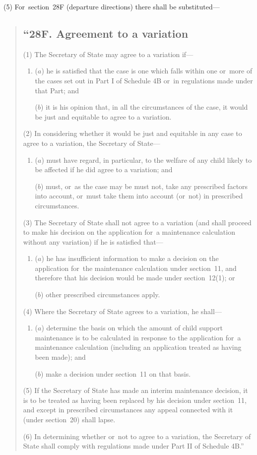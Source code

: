 \documentclass[12pt,a4paper]{article}
\begin{document}
(5) For~section~28F (departure directions) there shall be substituted—
\begin{quotation}
\subsection*{“28F. Agreement to a variation}

(1) The Secretary of State may agree to a variation if—
\begin{enumerate}\item[]
($a$) he is satisfied that the case is one which falls within one or~more of the cases set out in Part I of Schedule 4B or~in regulations made under that Part; and

($b$) it is his opinion that, in all the circumstances of the case, it would be just and equitable to agree to a variation.
\end{enumerate}

(2) In considering whether it would be just and equitable in any case to agree to a variation, the Secretary of State—
\begin{enumerate}\item[]
($a$) must have regard, in particular, to the welfare of any child likely to be affected if he did agree to a variation; and

($b$) must, or~as the case may be must not, take any prescribed factors into account, or~must take them into account (or~not) in prescribed circumstances.
\end{enumerate}

(3) The Secretary of State shall not agree to a variation (and shall proceed to make his decision on the application for~a maintenance calculation without any variation) if he is satisfied that—
\begin{enumerate}\item[]
($a$) he has insufficient information to make a decision on the application for~the maintenance calculation under section~11, and therefore that his decision would be made under section~12(1); or

($b$) other prescribed circumstances apply.
\end{enumerate}

(4) Where the Secretary of State agrees to a variation, he shall—
\begin{enumerate}\item[]
($a$) determine the basis on which the amount of child support maintenance is to be calculated in response to the application for~a maintenance calculation (including an application treated as having been made); and

($b$) make a decision under section~11 on that basis.
\end{enumerate}

(5) If the Secretary of State has made an interim maintenance decision, it is to be treated as having been replaced by his decision under section~11, and except in prescribed circumstances any appeal connected with it (under section~20) shall lapse.

(6) In determining whether or~not to agree to a variation, the Secretary of State shall comply with regulations made under Part II of Schedule 4B.”
\end{quotation}
\end{document}
